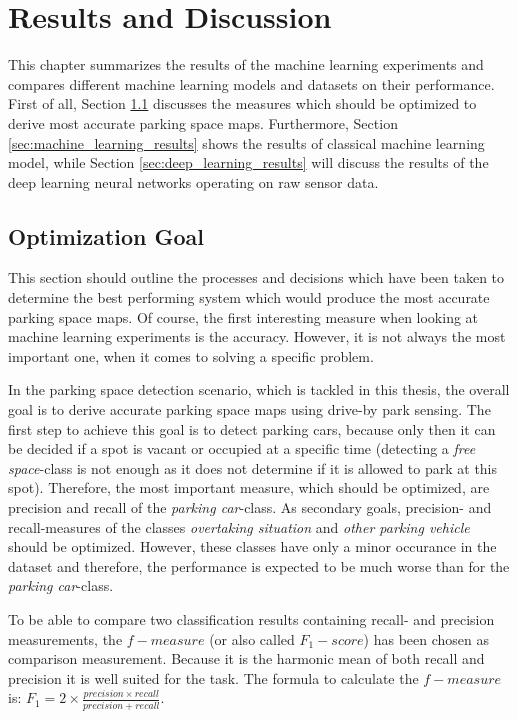 \chapter{Results and Discussion}
\label{chap:evaluation}

This chapter summarizes the results of the machine learning experiments and compares different machine learning models and datasets on their performance. First of all, Section \ref{sec:optimization_goal} discusses the measures which should be optimized to derive most accurate parking space maps. Furthermore, Section \ref{sec:machine_learning_results} shows the results of classical machine learning model, while Section \ref{sec:deep_learning_results} will discuss the results of the deep learning neural networks operating on raw sensor data.






\section{Optimization Goal}
\label{sec:optimization_goal}

This section should outline the processes and decisions which have been taken to determine the best performing system which would produce the most accurate parking space maps. Of course, the first interesting measure when looking at machine learning experiments is the accuracy. However, it is not always the most important one, when it comes to solving a specific problem. 

In the parking space detection scenario, which is tackled in this thesis, the overall goal is to derive accurate parking space maps using drive-by park sensing. The first step to achieve this goal is to detect parking cars, because only then it can be decided if a spot is vacant or occupied at a specific time (detecting a \emph{free space}-class is not enough as it does not determine if it is allowed to park at this spot). Therefore, the most important measure, which should be optimized, are precision and recall of the \emph{parking car}-class. As secondary goals, precision- and recall-measures of the classes \emph{overtaking situation} and \emph{other parking vehicle} should be optimized. However, these classes have only a minor occurance in the dataset and therefore, the performance is expected to be much worse than for the \emph{parking car}-class.

To be able to compare two classification results containing recall- and precision measurements, the $f-measure$ (or also called $F_1-score$) has been chosen as comparison measurement. Because it is the harmonic mean of both recall and precision it is well suited for the task. The formula to calculate the $f-measure$ is: $F_1 = 2 \times \frac{precision \times recall}{precision + recall}$.






